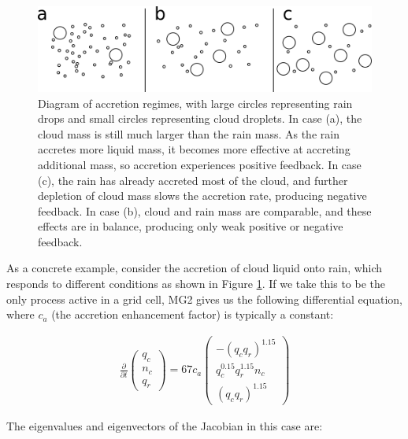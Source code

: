 \documentclass [11pt, proquest] {uwthesis}[2020/02/24]
\begin{document}
\begin{figure}[htbp]
  \includegraphics[width=6.5in]{./accretion_regimes.png}
  \caption[Diagram of accretion regimes]{Diagram of accretion regimes, with large circles representing rain drops and small circles representing cloud droplets. In case (a), the cloud mass is still much larger than the rain mass. As the rain accretes more liquid mass, it becomes more effective at accreting additional mass, so accretion experiences positive feedback. In case (c), the rain has already accreted most of the cloud, and further depletion of cloud mass slows the accretion rate, producing negative feedback. In case (b), cloud and rain mass are comparable, and these effects are in balance, producing only weak positive or negative feedback.}
  \label{accretion-regimes}
\end{figure}

As a concrete example, consider the accretion of cloud liquid onto rain, which responds to different conditions as shown in Figure \ref{accretion-regimes}. If we take this to be the only process active in a grid cell, MG2 gives us the following differential equation, where $c_a$ (the accretion enhancement factor) is typically a constant:

\begin{align}
  \frac{\partial}{\partial t}
  \begin{pmatrix}
    q_c \\ n_c \\ q_r
  \end{pmatrix}
  = 67 c_a
  \begin{pmatrix}
    -(q_c q_r)^{1.15} \\ q_c^{0.15} q_r^{1.15} n_c \\ (q_c q_r)^{1.15}
  \end{pmatrix}
\end{align}

The eigenvalues and eigenvectors of the Jacobian in this case are:
\end{document}
